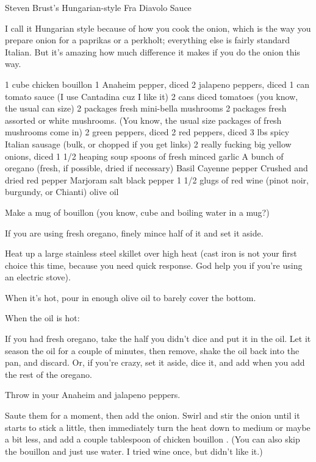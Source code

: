 Steven Brust's Hungarian-style Fra Diavolo Sauce

I call it Hungarian style because of how you cook the onion, which is the
way you prepare onion for a paprikas or a perkholt; everything else is
fairly standard Italian. But it's amazing how much difference it makes if
you do the onion this way.

    1 cube chicken bouillon
    1 Anaheim pepper, diced
    2 jalapeno peppers, diced
    1 can tomato sauce (I use Cantadina cuz I like it)
    2 cans diced tomatoes (you know, the usual can size)
    2 packages fresh mini-bella mushrooms
    2 packages fresh assorted or white mushrooms. (You know, the usual size packages of fresh mushrooms come in)
    2 green peppers, diced
    2 red peppers, diced
    3 lbs spicy Italian sausage (bulk, or chopped if you get links)
    2 really fucking big yellow onions, diced
    1 1/2 heaping soup spoons of fresh minced garlic
    A bunch of oregano (fresh, if possible, dried if necessary)
    Basil
    Cayenne pepper
    Crushed and dried red pepper
    Marjoram
    salt
    black pepper
    1 1/2 glugs of red wine (pinot noir, burgundy, or Chianti)
    olive oil

Make a mug of bouillon (you know, cube and boiling water in a mug?)

If you are using fresh oregano, finely mince half of it and set it aside.

Heat up a large stainless steel skillet over high heat (cast iron is not
your first choice this time, because you need quick response. God help you
if you're using an electric stove).

When it's hot, pour in enough olive oil to barely cover the bottom.

When the oil is hot:

If you had fresh oregano, take the half you didn't dice and put it in the
oil. Let it season the oil for a couple of minutes, then remove, shake the
oil back into the pan, and discard. Or, if you're crazy, set it aside, dice
it, and add when you add the rest of the oregano.

Throw in your Anaheim and jalapeno peppers.

Saute them for a moment, then add the onion. Swirl and stir the onion until
it starts to stick a little, then immediately turn the heat down to medium
or maybe a bit less, and add a couple tablespoon of chicken bouillon . (You
can also skip the bouillon and just use water. I tried wine once, but
didn't like it.)

